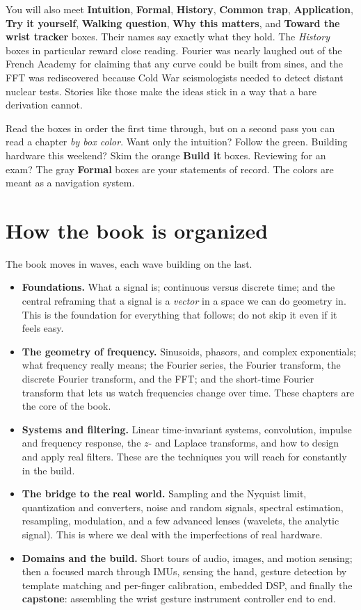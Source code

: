 You will also meet \textbf{Intuition}, \textbf{Formal}, \textbf{History}, \textbf{Common
trap}, \textbf{Application}, \textbf{Try it yourself}, \textbf{Walking question},
\textbf{Why this matters}, and \textbf{Toward the wrist tracker} boxes. Their names say
exactly what they hold. The \emph{History} boxes in particular reward close reading.
Fourier was nearly laughed out of the French Academy for claiming that any
curve could be built from sines, and the FFT was rediscovered because Cold War seismologists
needed to detect distant nuclear tests. Stories like those make the ideas stick in a way that a bare derivation
cannot.

\begin{intuitionbox}
Read the boxes in order the first time through, but on a second pass you can read a chapter
\emph{by box color}. Want only the intuition? Follow the green. Building hardware this
weekend? Skim the orange \textbf{Build it} boxes. Reviewing for an exam? The gray
\textbf{Formal} boxes are your statements of record. The colors are meant as a navigation
system.
\end{intuitionbox}

\section*{How the book is organized}

The book moves in waves, each wave building on the last.

\begin{itemize}
  \item \textbf{Foundations.} What a signal is; continuous versus discrete time; and the
  central reframing that a signal is a \emph{vector} in a space we can do geometry in. This
  is the foundation for everything that follows; do not skip it even if it feels easy.
  \item \textbf{The geometry of frequency.} Sinusoids, phasors, and complex exponentials;
  what frequency really means; the Fourier series, the Fourier transform, the discrete
  Fourier transform, and the FFT; and the short-time Fourier transform that lets us watch
  frequencies change over time. These chapters are the core of the book.
  \item \textbf{Systems and filtering.} Linear time-invariant systems, convolution, impulse
  and frequency response, the $z$- and Laplace transforms, and how to design and apply real
  filters. These are the techniques you will reach for constantly in the build.
  \item \textbf{The bridge to the real world.} Sampling and the Nyquist limit, quantization
  and converters, noise and random signals, spectral estimation, resampling, modulation, and
  a few advanced lenses (wavelets, the analytic signal). This is where we deal with
  the imperfections of real hardware.
  \item \textbf{Domains and the build.} Short tours of audio, images, and motion sensing;
  then a focused march through IMUs, sensing the hand, gesture detection by template
  matching and per-finger calibration, embedded DSP, and finally the \textbf{capstone}:
  assembling the wrist gesture instrument controller end to end.
\end{itemize}

